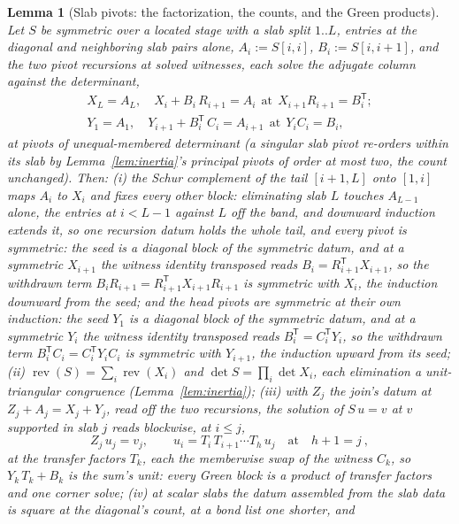 \documentclass[11pt]{article}
\newtheorem{lemma}{Lemma}
\theoremstyle{definition}
\begin{document}
\begin{lemma}[Slab pivots: the factorization, the counts, and the Green
products]\label{lem:greenprod}
Let $S$ be symmetric over a located stage with a slab split $1..L$,
entries at the diagonal and neighboring slab pairs alone,
$A_i:=S[i,i]$, $B_i:=S[i,i+1]$, and the two
pivot recursions at solved witnesses, each solve the adjugate column
against the determinant,
\begin{gather*}
X_L=A_L,\quad X_i+B_i\,R_{i+1}=A_i\ \ \text{at}\ \
X_{i+1}R_{i+1}=B_i^{\mathsf T};\\
Y_1=A_1,\quad Y_{i+1}+B_i^{\mathsf T}\,C_i=A_{i+1}\ \ \text{at}\ \
Y_iC_i=B_i ,
\end{gather*}
at pivots of unequal-membered determinant (a singular slab pivot
re-orders within its slab by
Lemma~\ref{lem:inertia}'s principal pivots of order at most two, the count
unchanged). Then:
\emph{(i)} the Schur complement of the tail $[i{+}1,L]$ onto $[1,i]$
maps $A_i$ to $X_i$ and fixes every other block: eliminating slab $L$
touches $A_{L-1}$ alone, the entries at $i<L-1$ against $L$ off the
band, and downward induction
extends it, so one recursion datum holds the whole tail, and every
pivot is symmetric: the seed is a diagonal block of the symmetric
datum, and at a symmetric $X_{i+1}$ the witness identity transposed
reads $B_i=R_{i+1}^{\mathsf T}X_{i+1}$, so the withdrawn term
$B_iR_{i+1}=R_{i+1}^{\mathsf T}X_{i+1}R_{i+1}$ is symmetric with $X_i$,
the induction downward from the seed; and the head pivots are
symmetric at their own induction: the seed $Y_1$ is a diagonal block
of the symmetric datum, and at a symmetric $Y_i$ the witness identity
transposed reads $B_i^{\mathsf T}=C_i^{\mathsf T}Y_i$, so the
withdrawn term $B_i^{\mathsf T}C_i=C_i^{\mathsf T}Y_iC_i$ is
symmetric with $Y_{i+1}$, the induction upward from its seed;
\emph{(ii)} $\operatorname{rev}(S)=\sum_i\operatorname{rev}(X_i)$
and $\det S=\prod_i\det X_i$, each elimination a unit-triangular
congruence (Lemma~\ref{lem:inertia});
\emph{(iii)} with $Z_j$ the join's datum at $Z_j+A_j=X_j+Y_j$, read
off the two recursions, the solution of $S\,u=v$ at $v$ supported in
slab $j$ reads blockwise, at $i\le j$,
\[
Z_j\,u_j=v_j,
\qquad
u_i=T_i\,T_{i+1}\cdots T_h\,u_j\quad\text{at}\quad h+1=j\ ,
\]
at the \emph{transfer factors} $T_k$, each the memberwise swap of
the witness $C_k$, so $Y_k\,T_k+B_k$ is the sum's unit:
every Green block is a product of transfer factors and one corner
solve;
\emph{(iv)} at scalar slabs the datum assembled from the slab data
is square at the diagonal's count, at a bond list one shorter, and

\end{lemma}
\end{document}

